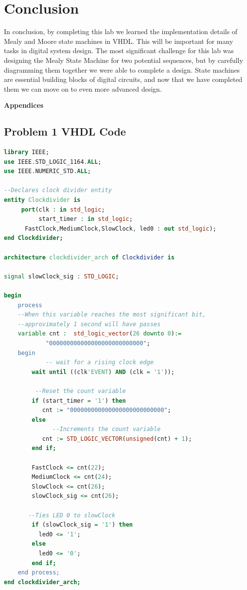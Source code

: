 \documentclass[11pt]{article}
\begin{document}
\section{Conclusion}
In conclusion, by completing this lab we learned the implementation details of Mealy and Moore state machines in VHDL. This will be important for many tasks in digital system design. The most significant challenge for this lab was designing the Mealy State Machine for two potential sequences, but by carefully diagramming them together we were able to complete a design. State machines are essential building blocks of digital circuits, and now that we have completed them we can move on to even more advanced design.

\pagebreak

\textbf{Appendices}

\begin{appendices}

\section{Problem 1 VHDL Code}

\begin{lstlisting}[language=VHDL]
library IEEE;
use IEEE.STD_LOGIC_1164.ALL;
use IEEE.NUMERIC_STD.ALL;

--Declares clock divider entity 
entity Clockdivider is
     port(clk : in std_logic;
          start_timer : in std_logic;
	  FastClock,MediumClock,SlowClock, led0 : out std_logic);
end Clockdivider;

architecture clockdivider_arch of Clockdivider is

signal slowClock_sig : STD_LOGIC;

begin
    process 
    --When this variable reaches the most significant bit,
    --approvimately 1 second will have passes 
    variable cnt :	std_logic_vector(26 downto 0):= 
    		"000000000000000000000000000";
    begin					 
    		-- wait for a rising clock edge
        wait until ((clk'EVENT) AND (clk = '1'));
	       
	     --Reset the count variable
		if (start_timer = '1') then
	       cnt := "000000000000000000000000000";
	    else  
	    	  --Increments the count variable
           cnt := STD_LOGIC_VECTOR(unsigned(cnt) + 1);
	    end if;

   	    FastClock <= cnt(22);
   	    MediumClock <= cnt(24);	
   	    SlowClock <= cnt(26);
        slowClock_sig <= cnt(26);
	
	   --Ties LED 0 to slowClock
        if (slowClock_sig = '1') then
		  led0 <= '1';
	    else
		  led0 <= '0';
	    end if;
	end process;
end clockdivider_arch;
\end{lstlisting}


\end{appendices}
\end{document}
